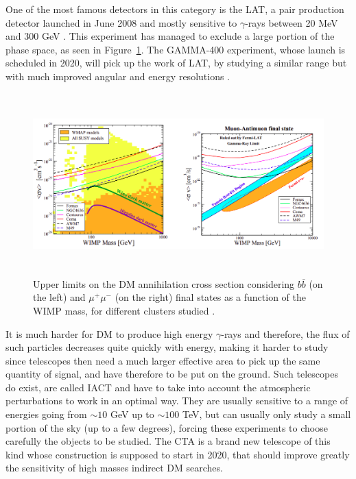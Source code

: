 \documentclass[a4paper, 10pt, openright]{report}
\begin{document}
One of the most famous detectors in this category is the \ac{LAT}, a pair production detector launched in June 2008 and mostly sensitive to $\gamma$-rays between 20 MeV and 300 GeV \cite{LATExperiment}. This experiment has managed to exclude a large portion of the phase space, as seen in Figure~\ref{figure:LATExclusion}. The GAMMA-400 experiment, whose launch is scheduled in 2020, will pick up the work of \ac{LAT}, by studying a similar range but with much improved angular and energy resolutions \cite{GAMMA400}. 

\begin{figure}[htbp]
\begin{center}
\includegraphics[width=14.8cm, height=7cm]{figs/LATExclusion.png}
\caption{Upper limits on the \ac{DM} annihilation cross section considering $b \bar b$ (on the left) and $\mu^+ \mu^-$ (on the right) final states as a function of the \ac{WIMP} mass, for different clusters studied \cite{LATExperiment}.}
\label{figure:LATExclusion}
\end{center}
\end{figure}

It is much harder for \ac{DM} to produce high energy $\gamma$-rays and therefore, the flux of such particles decreases quite quickly with energy, making it harder to study since telescopes then need a much larger effective area to pick up the same quantity of signal, and have therefore to be put on the ground. Such telescopes do exist, are called \ac{IACT} and have to take into account the atmospheric perturbations to work in an optimal way. They are usually sensitive to a range of energies going from $\sim 10$ GeV up to $\sim 100$ TeV, but can usually only study a small portion of the sky (up to a few degrees), forcing these experiments to choose carefully the objects to be studied. The \ac{CTA} is a brand new telescope of this kind whose construction is supposed to start in 2020, that should improve greatly the sensitivity of high masses indirect \ac{DM} searches.
\end{document}
